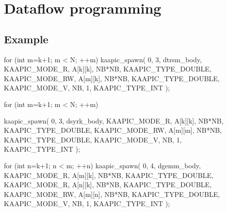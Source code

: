 \documentclass[a4paper, 11pt]{article}
\makeatletter
\newenvironment{apisection}[2][noshortnameprovided]{%
  \newpage
  \section{#2}
  \label{api@#1}
  \newcommand{\api@newpart}[4][noshortpartnameprovided]{%
    \newenvironment{##1}{%
      \subsection{##2}%
      \label{api@#1@##1}%
      ##3%
    }{##4}%
  }%
  \api@newpart[synopsis]{Synopsis}{}{}%
  \api@newpart[call]{Call}{}{}%
  \api@newpart[desc]{Description}{}{}%
  \api@newpart[params]{Parameters}{%
    \let\api@indesc\@empty
    \newcommand{\param}[1]{%
      \def\api@indesc{yes}%
      \begin{description}%
        \renewcommand{\param}[1]{\item[########1]}%
      \item[####1]
      }%
      \newenvironment{parameters}{%
        \begin{description}%
          \renewcommand{\param}[1]{\item[########1]}%
        }{%
        \end{description}%
      }
    }{%
      \ifx\api@indesc\@empty\relax\else%
    \end{description}%
    \fi%
  }%
  \api@newpart[ret]{Return value}{%
    \newcommand{\otherret}{\par\medskip\noindent}%
  }{}%
  \api@newpart[example]{Example}{}{}%
}{}
\makeatother
\begin{document}
\begin{apisection}[dataflow]{Dataflow programming}
\begin{example}
\begin{code}
{      for (int m=k+1; m < N; ++m)
        kaapic_spawn( 0, 3, dtrsm_body, 
          KAAPIC_MODE_R,  A[k][k], NB*NB, KAAPIC_TYPE_DOUBLE,
          KAAPIC_MODE_RW, A[m][k], NB*NB, KAAPIC_TYPE_DOUBLE,
          KAAPIC_MODE_V, NB, 1, KAAPIC_TYPE_INT
        );

      for (int m=k+1; m < N; ++m)
      {
        kaapic_spawn( 0, 3, dsyrk_body,
          KAAPIC_MODE_R,  A[k][k], NB*NB, KAAPIC_TYPE_DOUBLE,
          KAAPIC_MODE_RW, A[m][m], NB*NB, KAAPIC_TYPE_DOUBLE, 
          KAAPIC_MODE_V, NB, 1, KAAPIC_TYPE_INT
        );

        for (int n=k+1; n < m; ++n)
        {
          kaapic_spawn( 0, 4, dgemm_body,
            KAAPIC_MODE_R,  A[m][k], NB*NB, KAAPIC_TYPE_DOUBLE,
            KAAPIC_MODE_R, A[n][k], NB*NB, KAAPIC_TYPE_DOUBLE, 
            KAAPIC_MODE_RW, A[m][n], NB*NB, KAAPIC_TYPE_DOUBLE, 
            KAAPIC_MODE_V, NB, 1, KAAPIC_TYPE_INT
          );
        }
      }
    }
  \end{code}
  \end{example}
\end{apisection}
\end{document}
